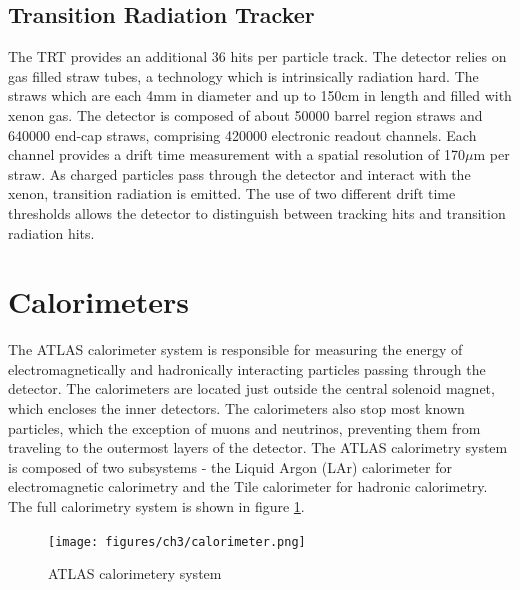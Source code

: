 \subsection{Transition Radiation Tracker}
The TRT provides an additional 36 hits per particle track. The detector relies on gas filled straw tubes, a technology which is intrinsically radiation hard. The straws which are each 4mm in diameter and up to 150cm in length and filled with xenon gas. The detector is composed of about 50000 barrel region straws and 640000 end-cap straws, comprising 420000 electronic readout channels. Each channel provides a drift time measurement with a spatial resolution of 170$\mu$m per straw. As charged particles pass through the detector and interact with the xenon, transition radiation is emitted. The use of two different drift time thresholds allows the detector to distinguish between tracking hits and transition radiation hits. 

\section{Calorimeters}
The ATLAS calorimeter system is responsible for measuring the energy of electromagnetically and hadronically interacting particles passing through the detector. The calorimeters are located just outside the central solenoid magnet, which encloses the inner detectors. The calorimeters also stop most known particles, which the exception of muons and neutrinos, preventing them from traveling to the outermost layers of the detector. The ATLAS calorimetry system is composed of two subsystems - the Liquid Argon (LAr) calorimeter for electromagnetic calorimetry and the Tile calorimeter for hadronic calorimetry. The full calorimetry system is shown in figure \ref{fig:calorimeters}.

\begin{figure}
        \centering
	\texttt{[image: figures/ch3/calorimeter.png]}
	\caption{ATLAS calorimetery system \cite{calorimeter_img}}
	\label{fig:calorimeters}
\end{figure}

